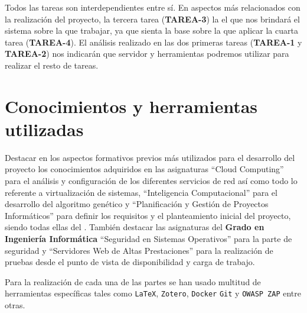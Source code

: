 Todos las tareas son interdependientes entre sí. En aspectos más relacionados con la realización del proyecto, la tercera tarea (\textbf{TAREA-3}) la el que nos brindará el sistema sobre la que trabajar, ya que sienta la base sobre la que aplicar la cuarta tarea (\textbf{TAREA-4}). El análisis realizado en las dos primeras tareas (\textbf{TAREA-1} y \textbf{TAREA-2}) nos indicarán que servidor y herramientas podremos utilizar para realizar el resto de tareas.

\section{Conocimientos y herramientas utilizadas}

\bigskip
Destacar en los aspectos formativos previos más utilizados para el desarrollo del proyecto los conocimientos adquiridos en las asignaturas ``Cloud Computing'' para el análisis y configuración de los diferentes servicios de red así como todo lo referente a virtualización de sistemas, ``Inteligencia Computacional'' para el desarrollo del algoritmo genético y ``Planificación y Gestión de Proyectos Informáticos'' para definir los requisitos y el planteamiento inicial del proyecto, siendo todas ellas del \textbf{\master}. También destacar las asignaturas del \textbf{Grado en Ingeniería Informática} ``Seguridad en Sistemas Operativos'' para la parte de seguridad y ``Servidores Web de Altas Prestaciones'' para la realización de pruebas desde el punto de vista de disponibilidad y carga de trabajo.

\bigskip
Para la realización de cada una de las partes se han usado multitud de herramientas específicas tales como \texttt{LaTeX}, \texttt{Zotero}, \texttt{Docker} \texttt{Git} y \texttt{OWASP ZAP} entre otras.

